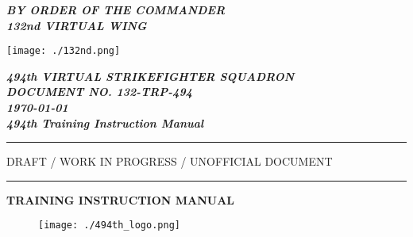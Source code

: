 \begin{titlepage}
	\begin{center}

        \begin{flushleft}
          \small
          \textbf{\textit{BY ORDER OF THE COMMANDER\\132nd VIRTUAL WING\\}}
        \end{flushleft}

        \begin{flushleft}
        	\texttt{[image: ./132nd.png]}
        \end{flushleft}
        
        \vspace*{-5.6cm}
        
        \begin{flushright}
          \small
          \textbf{\textit{494th VIRTUAL STRIKEFIGHTER SQUADRON}}\\
          \textbf{\textit{DOCUMENT NO. 132-TRP-494}}\\
          \vspace*{2.6cm}
          \textbf{\textit{\today}}\\
          \textbf{\textit{494th Training Instruction Manual}}\\
        \end{flushright}
        
        \vspace*{0.35cm}
        
        \hrule
       	    
        \vspace{.5cm}
        
        \begin{center}
          \small
          \large{
            DRAFT / WORK IN PROGRESS / UNOFFICIAL DOCUMENT
          }        
        \end{center}

        \vspace{.5cm}

        \hrule

        \vspace{1.5cm}

        \begin{center}
          \small
          \LARGE{
            \textbf{TRAINING INSTRUCTION MANUAL}
          }
        \end{center}

        \vspace{.5cm}

        \begin{figure}[!ht]
          \centering
          \texttt{[image: ./494th\_logo.png]}
          \label{fig:494th_logo}
        \end{figure}

        \vfill
        
        \normalsize
        
        
	\end{center}
\end{titlepage}
